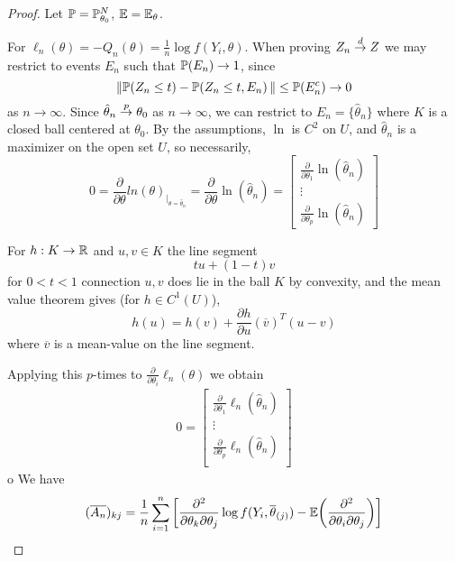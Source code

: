 \begin{proof}
  Let $\Prob = \Prob_{\theta_{0}}^{N}$, $\E = \mathbb{E}_{\theta}$.

  For $\ell_{n}(\theta) = -Q_{n}(\theta) = \frac{1}{n} \log f(Y_{i},
  \theta)$.  When proving $Z_{n} \overset{d}{\rightarrow} Z$ we may restrict to events
  $E_{n}$ such that $\Prob{E_{n}} \rightarrow 1$, since
  \begin{equation}
    \label{eq:61}
    \| \Prob{Z_{n} \leq t}- \Prob{Z_{n} \leq t, E_{n}} \| \leq
    \Prob{E_{n}^{c}} \rightarrow 0
  \end{equation} as $n \rightarrow \infty$.  Since $\hat \theta_{n}
  \overset{p}{\rightarrow} \theta_{0}$ as $n \rightarrow \infty$, we can restrict to $E_{n}
  = \{ \hat \theta_{n} \}$ where $K$ is a closed ball centered at
  $\theta_{0}$.  By the assumptions, $\ln$ is $C^{2}$ on $U$, and
  $\hat \theta_{n}$ is a maximizer on the open set $U$, so necessarily,
  \begin{equation}
    \label{eq:62}
    0 = \frac{\partial}{\partial \theta} ln(\theta)_{|_{\theta = \hat \theta_{n}}} =
    \frac{\partial}{\partial \theta} \ln (\hat \theta_{n}) =
    \begin{bmatrix}
      \frac{\partial}{\partial \theta_{1}} \ln (\hat \theta_{n}) \\
      \vdots \\
      \frac{\partial}{\partial \theta_{p}} \ln (\hat \theta_{n})
    \end{bmatrix}
  \end{equation}

  For $h: K \rightarrow \mathbb{R}$ and $u, v \in K$ the line segment
  \begin{equation}
    \label{eq:63}
    tu + (1-t)v
  \end{equation} for $0 < t < 1$ connection $u, v$ does lie in the
  ball $K$ by convexity, and the mean value theorem gives (for $h \in
  C^{1}(U)$),
  \begin{equation}
    \label{eq:64}
    h(u) = h(v) + \frac{\partial h}{\partial u} (\overline v)^{T} (u-v)
  \end{equation} where $\overline v$ is a mean-value on the line
  segment.

  Applying this $p$-times to $\frac{\partial}{\partial \theta_{i}}
  \ell_{n}(\theta)$ we obtain
  \begin{align}
    \label{eq:65}
    0 =
    \begin{bmatrix}
      \frac{\partial}{\partial \theta_{1}} \ell_{n}(\hat \theta_{n})  \\
      \vdots \\
      \frac{\partial}{\partial \theta_{p}} \ell_{n}(\hat \theta_{n})  \\
    \end{bmatrix} 
  \end{align} 
o
  We have
  \begin{align}
    \label{eq:66}
    (\overline{A_{n}})_{kj} = \frac{1}{n} \sum_{i=1}^{n} \left[
    \frac{\partial^{2}}{\partial \theta_{k} \partial \theta_{j}} \log
    f(Y_{i}, \overline{\theta}_{(j)}) -
    \E{\frac{\partial^{2}}{\partial \theta_{i} \partial \theta_{j}}} \right]
  \end{align}
\end{proof}
